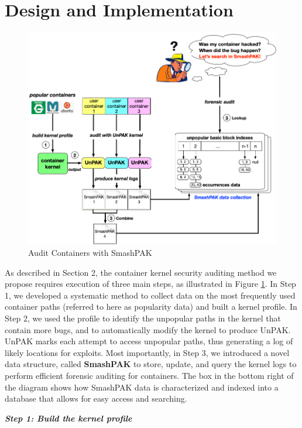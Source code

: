 \section{Design and Implementation}
\label{sec.design}

\begin{figure}
\centering
\includegraphics[width=2.2\columnwidth]{diagram/SmashPAK.png}
\caption{\small Audit Containers with SmashPAK}
\label{fig:design}
\end{figure}

As described in Section 2, the container kernel security auditing method we propose requires execution of three main steps, as illustrated in Figure \ref{fig:design}. 
In Step 1, we developed a systematic method to collect data on the most frequently used container paths (referred to here as popularity data) and built a kernel profile. 
In Step 2, we used the profile to identify the unpopular paths in the kernel that contain more bugs, and to automatically modify the kernel to produce UnPAK. 
UnPAK marks each attempt to access unpopular paths, thus generating a log of likely locations for exploits. 
Most importantly, in Step 3, we introduced a novel data structure, called \textbf{SmashPAK} to store, update, and query the kernel logs to perform efficient forensic auditing for containers. 
The box in the bottom right of the diagram shows how SmashPAK data is characterized and indexed into a database that allows for easy access and searching.

\noindent
\textit{\textbf{Step 1: Build the kernel profile}}

